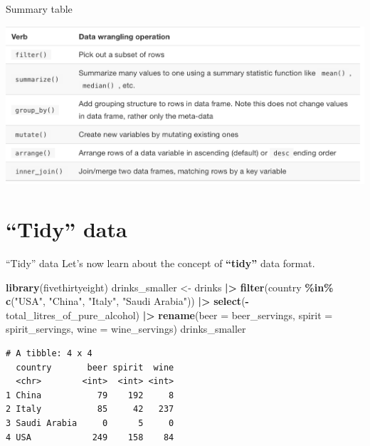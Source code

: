 \documentclass[
  ignorenonframetext,
]{beamer}
\newenvironment{Shaded}{\begin{snugshade}}{\end{snugshade}}
\newcommand{\AttributeTok}[1]{\textcolor[rgb]{0.13,0.29,0.53}{#1}}
\newcommand{\FunctionTok}[1]{\textcolor[rgb]{0.13,0.29,0.53}{\textbf{#1}}}
\newcommand{\NormalTok}[1]{#1}
\newcommand{\OtherTok}[1]{\textcolor[rgb]{0.56,0.35,0.01}{#1}}
\newcommand{\SpecialCharTok}[1]{\textcolor[rgb]{0.81,0.36,0.00}{\textbf{#1}}}
\newcommand{\StringTok}[1]{\textcolor[rgb]{0.31,0.60,0.02}{#1}}
\begin{document}
\begin{frame}{Summary table}
\protect\hypertarget{summary-table}{}
\begin{center}\includegraphics[width=0.8\linewidth,height=0.6\textheight]{week3_7} \end{center}
\end{frame}

\hypertarget{tidy-data}{%
\section{``Tidy'' data}\label{tidy-data}}

\begin{frame}[fragile]{``Tidy'' data}
\protect\hypertarget{tidy-data-1}{}
Let's now learn about the concept of \textbf{``tidy''} data format.

\small

\begin{Shaded}
\begin{Highlighting}[]
\FunctionTok{library}\NormalTok{(fivethirtyeight)}
\NormalTok{drinks\_smaller }\OtherTok{\textless{}{-}}\NormalTok{ drinks }\SpecialCharTok{|\textgreater{}} 
  \FunctionTok{filter}\NormalTok{(country }\SpecialCharTok{\%in\%} \FunctionTok{c}\NormalTok{(}\StringTok{"USA"}\NormalTok{, }\StringTok{"China"}\NormalTok{, }\StringTok{"Italy"}\NormalTok{, }
                        \StringTok{"Saudi Arabia"}\NormalTok{)) }\SpecialCharTok{|\textgreater{}} 
  \FunctionTok{select}\NormalTok{(}\SpecialCharTok{{-}}\NormalTok{total\_litres\_of\_pure\_alcohol) }\SpecialCharTok{|\textgreater{}} 
  \FunctionTok{rename}\NormalTok{(}\AttributeTok{beer =}\NormalTok{ beer\_servings, }\AttributeTok{spirit =}\NormalTok{ spirit\_servings, }
         \AttributeTok{wine =}\NormalTok{ wine\_servings)}
\NormalTok{drinks\_smaller}
\end{Highlighting}
\end{Shaded}

\begin{verbatim}
# A tibble: 4 x 4
  country       beer spirit  wine
  <chr>        <int>  <int> <int>
1 China           79    192     8
2 Italy           85     42   237
3 Saudi Arabia     0      5     0
4 USA            249    158    84
\end{verbatim}

\normalsize
\end{frame}
\end{document}
